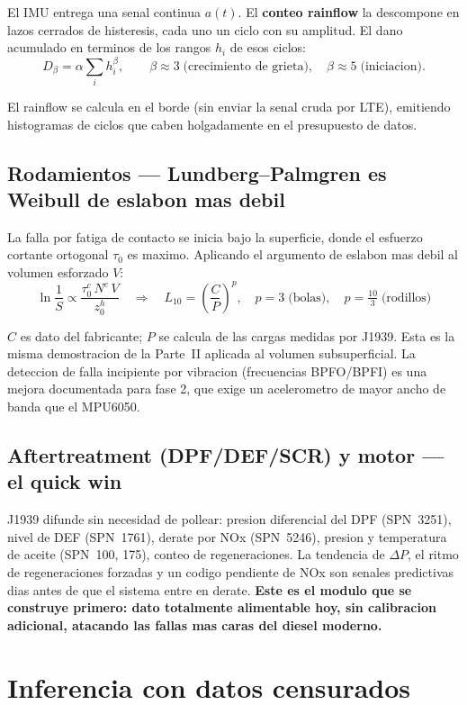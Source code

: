 \documentclass[10.5pt,a4paper]{article}
\begin{document}
El IMU entrega una senal continua $a(t)$. El \textbf{conteo rainflow} la descompone en lazos cerrados de histeresis, cada uno un ciclo con su amplitud. El dano acumulado en terminos de los rangos $h_i$ de esos ciclos:
$$D_\beta = \alpha\sum_i h_i^\beta, \qquad \beta \approx 3 \;\text{(crecimiento de grieta)},\quad \beta \approx 5 \;\text{(iniciacion)}.$$

El rainflow se calcula en el borde (sin enviar la senal cruda por LTE), emitiendo histogramas de ciclos que caben holgadamente en el presupuesto de datos.

\subsection{Rodamientos --- Lundberg--Palmgren es Weibull de eslabon mas debil}

La falla por fatiga de contacto se inicia bajo la superficie, donde el esfuerzo cortante ortogonal $\tau_0$ es maximo. Aplicando el argumento de eslabon mas debil al volumen esforzado $V$:
$$\ln\frac{1}{S} \propto \frac{\tau_0^c\,N^e\,V}{z_0^h} \quad\Longrightarrow\quad \boxed{L_{10} = \left(\frac{C}{P}\right)^p, \quad p=3 \;\text{(bolas)},\quad p=\tfrac{10}{3} \;\text{(rodillos)}}$$

$C$ es dato del fabricante; $P$ se calcula de las cargas medidas por J1939. Esta es la misma demostracion de la Parte~II aplicada al volumen subsuperficial. La deteccion de falla incipiente por vibracion (frecuencias BPFO/BPFI) es una mejora documentada para fase 2, que exige un acelerometro de mayor ancho de banda que el MPU6050.

\subsection{Aftertreatment (DPF/DEF/SCR) y motor --- el quick win}

J1939 difunde sin necesidad de pollear: presion diferencial del DPF (SPN~3251), nivel de DEF (SPN~1761), derate por NOx (SPN~5246), presion y temperatura de aceite (SPN~100, 175), conteo de regeneraciones. La tendencia de $\Delta P$, el ritmo de regeneraciones forzadas y un codigo pendiente de NOx son senales predictivas dias antes de que el sistema entre en derate. \textbf{Este es el modulo que se construye primero: dato totalmente alimentable hoy, sin calibracion adicional, atacando las fallas mas caras del diesel moderno.}

\section{Inferencia con datos censurados}
\end{document}
